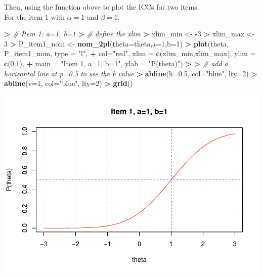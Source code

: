 \documentclass[
]{article}
\newenvironment{Shaded}{\begin{snugshade}}{\end{snugshade}}
\newcommand{\AttributeTok}[1]{\textcolor[rgb]{0.13,0.29,0.53}{#1}}
\newcommand{\CommentTok}[1]{\textcolor[rgb]{0.56,0.35,0.01}{\textit{#1}}}
\newcommand{\DecValTok}[1]{\textcolor[rgb]{0.00,0.00,0.81}{#1}}
\newcommand{\ErrorTok}[1]{\textcolor[rgb]{0.64,0.00,0.00}{\textbf{#1}}}
\newcommand{\FloatTok}[1]{\textcolor[rgb]{0.00,0.00,0.81}{#1}}
\newcommand{\FunctionTok}[1]{\textcolor[rgb]{0.13,0.29,0.53}{\textbf{#1}}}
\newcommand{\NormalTok}[1]{#1}
\newcommand{\OtherTok}[1]{\textcolor[rgb]{0.56,0.35,0.01}{#1}}
\newcommand{\SpecialCharTok}[1]{\textcolor[rgb]{0.81,0.36,0.00}{\textbf{#1}}}
\newcommand{\StringTok}[1]{\textcolor[rgb]{0.31,0.60,0.02}{#1}}
\begin{document}
Then, using the function above to plot the ICCs for two items.\\
For the item 1 with \(\alpha=1\) and \(\beta =1\).

\begin{Shaded}
\begin{Highlighting}[]
\SpecialCharTok{\textgreater{}} \CommentTok{\# Item 1: a=1, b=1}
\ErrorTok{\textgreater{}} \CommentTok{\# define the xlim}
\ErrorTok{\textgreater{}}\NormalTok{ xlim\_min }\OtherTok{\textless{}{-}} \SpecialCharTok{{-}}\DecValTok{3}
\SpecialCharTok{\textgreater{}}\NormalTok{ xlim\_max }\OtherTok{\textless{}{-}} \DecValTok{3}
\SpecialCharTok{\textgreater{}}\NormalTok{ P\_item1\_nom }\OtherTok{\textless{}{-}} \FunctionTok{nom\_2pl}\NormalTok{(}\AttributeTok{theta=}\NormalTok{theta,}\AttributeTok{a=}\DecValTok{1}\NormalTok{,}\AttributeTok{b=}\DecValTok{1}\NormalTok{)}
\SpecialCharTok{\textgreater{}} \FunctionTok{plot}\NormalTok{(theta, P\_item1\_nom, }\AttributeTok{type =} \StringTok{"l"}\NormalTok{, }
\SpecialCharTok{+}      \AttributeTok{col=}\StringTok{"red"}\NormalTok{, }\AttributeTok{xlim =} \FunctionTok{c}\NormalTok{(xlim\_min,xlim\_max), }\AttributeTok{ylim =} \FunctionTok{c}\NormalTok{(}\DecValTok{0}\NormalTok{,}\DecValTok{1}\NormalTok{),}
\SpecialCharTok{+}      \AttributeTok{main =} \StringTok{"Item 1, a=1, b=1"}\NormalTok{, }\AttributeTok{ylab =} \StringTok{"P(theta)"}\NormalTok{)}
\SpecialCharTok{\textgreater{}} 
\ErrorTok{\textgreater{}} \CommentTok{\# add a horizontal line at p=0.5 to see the b value}
\ErrorTok{\textgreater{}} \FunctionTok{abline}\NormalTok{(}\AttributeTok{h=}\FloatTok{0.5}\NormalTok{, }\AttributeTok{col=}\StringTok{"blue"}\NormalTok{, }\AttributeTok{lty=}\DecValTok{2}\NormalTok{)}
\SpecialCharTok{\textgreater{}} \FunctionTok{abline}\NormalTok{(}\AttributeTok{v=}\DecValTok{1}\NormalTok{, }\AttributeTok{col=}\StringTok{"blue"}\NormalTok{, }\AttributeTok{lty=}\DecValTok{2}\NormalTok{)}
\SpecialCharTok{\textgreater{}} \FunctionTok{grid}\NormalTok{()}
\end{Highlighting}
\end{Shaded}

\includegraphics[width=1\linewidth,height=0.5\textheight]{Assignment_1_files/figure-latex/unnamed-chunk-2-1}
\end{document}

